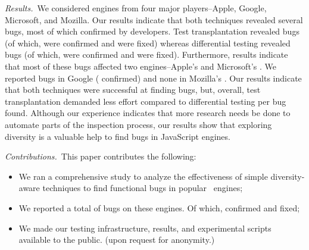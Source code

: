 \documentclass[10pt,conference,anonymous]{IEEEtran}
\begin{document}


\emph{Results.}~We considered engines from four major players--Apple,
Google, Microsoft, and Mozilla. Our results indicate that both
techniques revealed several bugs, most of which confirmed by
developers. Test transplantation revealed \noBugsTransplantation{}
bugs (of which, \noBugsTransplantationConfirmed{} were confirmed and
\noBugsTransplantationFixed{} were fixed) whereas differential testing
revealed \noBugsDifferentialTesting{} bugs (of which,
\noBugsDifferentialTestingConfirmed{} were confirmed and
\noBugsDifferentialTestingFixed{} were fixed). Furthermore, results
indicate that most of these bugs affected two engines--Apple's \jsc{}
and Microsoft's \chakra{}.  We reported \noBugsBugsReportedGoogle{}
bugs in Google \veight{} (\noBugsBugsConfirmedGoogle{} confirmed) and
none in Mozilla's \smonkey{}. Our results indicate that both
techniques were successful at finding bugs, but, overall, test
transplantation demanded less effort compared to differential testing
per bug found. Although our experience indicates that more research
needs be done to automate parts of the inspection process, our results
show that exploring diversity is a valuable help to find bugs in
JavaScript engines.


\emph{Contributions.}~This paper contributes the following:
\begin{itemize}
  \item We ran a comprehensive study to analyze the effectiveness of
    simple diversity-aware techniques to find functional bugs in
     popular \js\ engines;
    
  \item We reported a total of \totalBugsReported{} bugs on these
    engines. Of which, \totalBugsConfirmed{} confirmed and
    \totalBugsFixed{} fixed;
    
    
  \item We made our testing infrastructure, results, and experimental
    scripts available to the public. (upon request for anonymity.)

\end{itemize}
\end{document}
